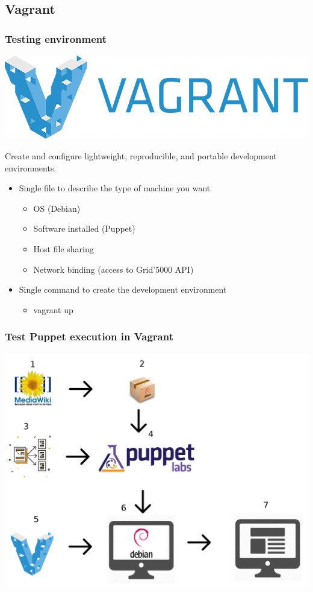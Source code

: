 \documentclass[11pt,compress,final]{beamer}
\begin{document}
\subsection{Vagrant}
\begin{frame}
\frametitle{Testing environment}
\begin{center}
\includegraphics[scale=0.15]{figures/vagrant}
\end{center}
\begin{block}{}
Create and configure lightweight, reproducible, and portable development environments.
\end{block}
\begin{itemize}
\item Single file to describe the type of machine you want
\begin{itemize}
\item OS (Debian)
\item Software installed (Puppet)
\item Host file sharing
\item Network binding (access to Grid'5000 API)
\end{itemize}
\item Single command to create the development environment
\begin{itemize}
\item vagrant up
\end{itemize}
\end{itemize}
\end{frame}

\begin{frame}
\frametitle{Test Puppet execution in Vagrant}
\includegraphics[scale=0.16]{figures/process}
\end{frame}
\end{document}
